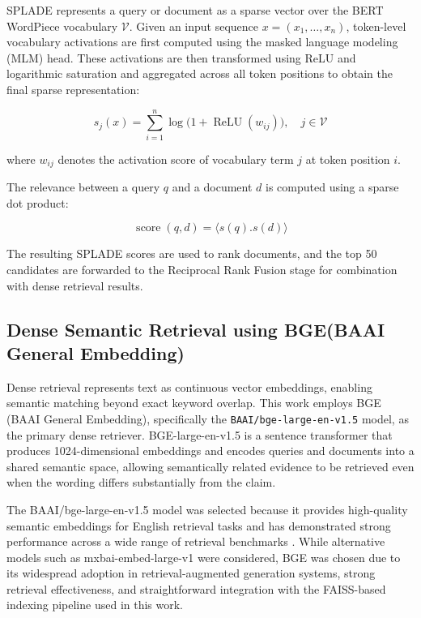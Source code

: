 SPLADE represents a query or document as a sparse vector over the BERT WordPiece vocabulary $\mathcal{V}$. Given an input sequence $x=(x_1,\ldots,x_n)$, token-level vocabulary activations are first computed using the masked language modeling (MLM) head. These activations are then transformed using ReLU and logarithmic saturation and aggregated across all token positions to obtain the final sparse representation:

\begin{equation}
s_j(x)=\sum_{i=1}^{n}\log\!\big(1+\operatorname{ReLU}(w_{ij})\big),
\quad j\in\mathcal{V}
\label{eq:splade_representation}
\end{equation}

where $w_{ij}$ denotes the activation score of vocabulary term $j$ at token position $i$.

The relevance between a query $q$ and a document $d$ is computed using a sparse dot product:

\begin{equation}
\operatorname{score}(q,d)
=
\langle s(q).s(d)\rangle
\label{eq:splade_score}
\end{equation}

The resulting SPLADE scores are used to rank documents, and the top 50 candidates are forwarded to the Reciprocal Rank Fusion stage for combination with dense retrieval results.

\subsection{Dense Semantic Retrieval using BGE(BAAI General Embedding)}

Dense retrieval represents text as continuous vector embeddings, enabling semantic matching beyond exact keyword overlap. This work employs BGE (BAAI General Embedding), specifically the \texttt{BAAI/bge-large-en-v1.5} model, as the primary dense retriever. BGE-large-en-v1.5 is a sentence transformer that produces 1024-dimensional embeddings and encodes queries and documents into a shared semantic space, allowing semantically related evidence to be retrieved even when the wording differs substantially from the claim.

The BAAI/bge-large-en-v1.5 model was selected because it provides high-quality semantic embeddings for English retrieval tasks and has demonstrated strong performance across a wide range of retrieval benchmarks . While alternative models such as mxbai-embed-large-v1 were considered, BGE was chosen due to its widespread adoption in retrieval-augmented generation systems, strong retrieval effectiveness, and straightforward integration with the FAISS-based indexing pipeline used in this work.

